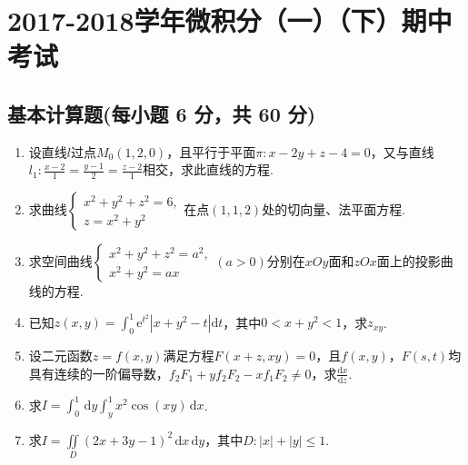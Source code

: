 \documentclass[../main.tex]{subfiles}
\begin{document}
\chapter{2017-2018学年微积分（一）（下）期中考试}

\section{基本计算题(每小题 6 分，共 60 分)}
\begin{enumerate}
    \item 设直线$l$过点$M_{0}(1,2,0)$，且平行于平面$\pi:x-2y+z-4=0$，又与直线$l_{1}
              :\frac{x-2}{1}=\frac{y-1}{2}=\frac{z-2}{1}$相交，求此直线的方程.
          \vspace{10em}

    \item 求曲线$\begin{cases}
                  x^{2}+y^{2}+z^{2}=6, \\
                  z=x^{2}+y^{2}
              \end{cases}$在点$(1,1,2)$处的切向量、法平面方程.
          \vspace{10em}

    \item 求空间曲线$\begin{cases}
                  x^{2}+y^{2}+z^{2}=a^{2}, \\
                  x^{2}+y^{2}=ax
              \end{cases}(a>0)$分别在$xOy$面和$zOx$面上的投影曲线的方程.
          \vspace{10em}

    \item 已知$z(x,y)=\int_{0}^{1}\mathrm{e}^{t^2}\left|x+y^{2}-t\right|\mathrm{d}
              t$，其中$0<x+y^{2}<1$，求$z_{xy}$.
          \vspace{13em}

    \item 设二元函数$z=f(x,y)$满足方程$F(x+z,xy)=0$，且$f(x,y)$，$F(s,t)$均具有连续的一阶偏导数，$f
                  _{2} F_{1}+y f_{2} F_{2} -x f_{1} F_{2} \neq 0$，求$\frac{\mathrm{d}x}{\mathrm{d}z}$.
          \vspace{12em}

    \item 求$I=\int_{0}^{1}\,\mathrm{d}y\int_{y}^{1}x^{2}\cos(xy)\,\mathrm{d}x$.
          \vspace{12em}

    \item 求$I=\iint\limits_{D}\left(2x+3y-1\right)^{2}\,\mathrm{d}x\,\mathrm{d}y$，其中$D
              :|x|+|y|\leq 1$.
          \vspace{13em}


\end{enumerate}
\end{document}
